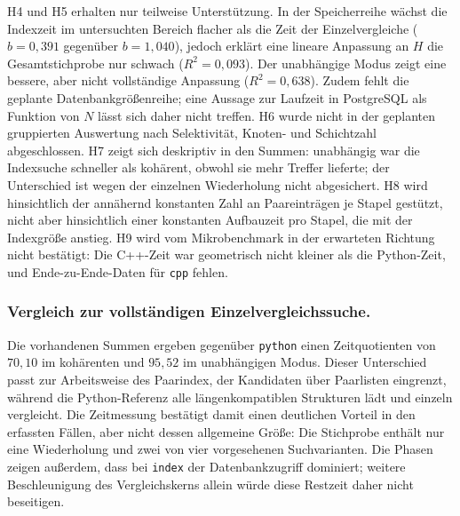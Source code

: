 \documentclass[a4paper,12pt, twoside]{report}
\theoremstyle{definition}
\begin{document}
H4 und H5 erhalten nur teilweise Unterstützung. In der Speicherreihe wächst die Indexzeit im untersuchten Bereich flacher als die Zeit der Einzelvergleiche ($b=0{,}391$ gegenüber $b=1{,}040$), jedoch erklärt eine lineare Anpassung an $H$ die Gesamtstichprobe nur schwach ($R^2=0{,}093$). Der unabhängige Modus zeigt eine bessere, aber nicht vollständige Anpassung ($R^2=0{,}638$). Zudem fehlt die geplante Datenbankgrößenreihe; eine Aussage zur Laufzeit in PostgreSQL als Funktion von $N$ lässt sich daher nicht treffen. H6 wurde nicht in der geplanten gruppierten Auswertung nach Selektivität, Knoten- und Schichtzahl abgeschlossen. H7 zeigt sich deskriptiv in den Summen: unabhängig war die Indexsuche schneller als kohärent, obwohl sie mehr Treffer lieferte; der Unterschied ist wegen der einzelnen Wiederholung nicht abgesichert. H8 wird hinsichtlich der annähernd konstanten Zahl an Paareinträgen je Stapel gestützt, nicht aber hinsichtlich einer konstanten Aufbauzeit pro Stapel, die mit der Indexgröße anstieg. H9 wird vom Mikrobenchmark in der erwarteten Richtung nicht bestätigt: Die C++-Zeit war geometrisch nicht kleiner als die Python-Zeit, und Ende-zu-Ende-Daten für \texttt{cpp} fehlen.

\subsubsection{Vergleich zur vollständigen Einzelvergleichssuche.} Die vorhandenen Summen ergeben gegenüber \texttt{python} einen Zeitquotienten von $70{,}10$ im kohärenten und $95{,}52$ im unabhängigen Modus. Dieser Unterschied passt zur Arbeitsweise des Paarindex, der Kandidaten über Paarlisten eingrenzt, während die Python-Referenz alle längenkompatiblen Strukturen lädt und einzeln vergleicht. Die Zeitmessung bestätigt damit einen deutlichen Vorteil in den erfassten Fällen, aber nicht dessen allgemeine Größe: Die Stichprobe enthält nur eine Wiederholung und zwei von vier vorgesehenen Suchvarianten. Die Phasen zeigen außerdem, dass bei \texttt{index} der Datenbankzugriff dominiert; weitere Beschleunigung des Vergleichskerns allein würde diese Restzeit daher nicht beseitigen.
\end{document}
